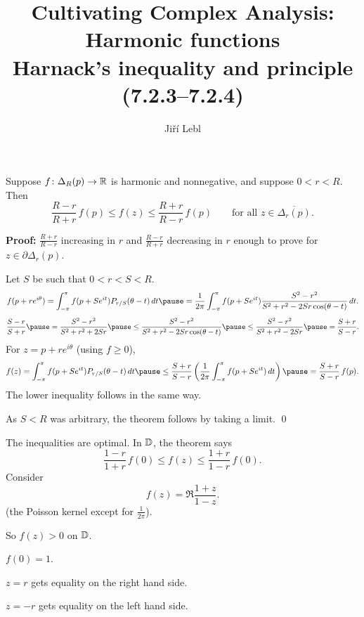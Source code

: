 \documentclass[10pt,aspectratio=169]{beamer}
\author{Ji\v{r}\'i Lebl}
\institute[OSU]{%
Departemento pri Matematiko de Oklahoma {\^S}tata Universitato}
\title{Cultivating Complex Analysis:\\%
Harmonic functions\\%
Harnack's inequality and principle (7.2.3--7.2.4)}
\date{}
\begin{document}
\begin{frame}
\titlepage
\end{frame}

\begin{frame}
\begin{theorem}
Suppose $f \colon \Delta_R(p) \to {\mathbb{R}}$ is harmonic and nonnegative,
and suppose $0 < r < R$.
Then
\vspace*{-6pt}
\[
\frac{R-r}{R+r} \, f(p) \leq f(z) \leq \frac{R+r}{R-r} \, f(p)
\qquad
\text{for all } z \in \overline{\Delta_r(p)}.
\]
\end{theorem}

\pause

\textbf{Proof:}
$\frac{R+r}{R-r}$ increasing in $r$ and
$\frac{R-r}{R+r}$ decreasing in $r$
\pause
\wthus
enough to prove for
$z \in \partial \Delta_r(p)$.

\pause
Let $S$ be such that $0 < r < S < R$.
\pause
\[
f(p + re^{i\theta})
=
\int_{-\pi}^\pi f(p+Se^{it}) P_{r/S}(\theta-t) \, dt
\pause
=
\frac{1}{2\pi} 
\int_{-\pi}^\pi f(p+Se^{it})
\frac{S^2-r^2}{S^2+r^2-2Sr \cos (\theta-t)}
\, dt .
\]
\pause
\[
\frac{S-r}{S+r}
\pause
=
\frac{S^2-r^2}{S^2+r^2+2Sr}
\pause
\leq
\frac{S^2-r^2}{S^2+r^2-2Sr \cos (\theta-t)}
\pause
\leq
\frac{S^2-r^2}{S^2+r^2-2Sr}
\pause
=
\frac{S+r}{S-r} .
\]
\pause
For $z = p+re^{i\theta}$ (using $f \geq 0$),
\[
f(z)
=
\int_{-\pi}^\pi f(p+Se^{it}) P_{r/S}(\theta-t) \, dt
\pause
\leq
\frac{S+r}{S-r} 
\left(
\frac{1}{2\pi}
\int_{-\pi}^\pi f(p+Se^{it}) \, dt
\right)
\pause
=
\frac{S+r}{S-r} 
\,
f(p) .
\]
\pause
The lower inequality follows in the same way.

\pause
As $S<R$ was arbitrary, the theorem follows by taking a limit.
\qed
\end{frame}

\begin{frame}
The inequalities are optimal.
\pause
In ${\mathbb{D}}$, the theorem says
\begin{equation*}
\frac{1-r}{1+r} \, f(0) \leq f(z) \leq \frac{1+r}{1-r} \, f(0) .
\end{equation*}
\pause
Consider
\[f(z) = \Re \frac{1+z}{1-z}.\]
(the Poisson kernel except for
$\frac{1}{2\pi}$).

\pause
\medskip

So $f(z) > 0$ on ${\mathbb{D}}$.

\pause
\medskip

$f(0)=1$.

\medskip
\pause

$z=r$ gets equality on the right hand side.

\medskip
\pause

$z=-r$ gets equality on the left hand side.
\end{frame}
\end{document}
